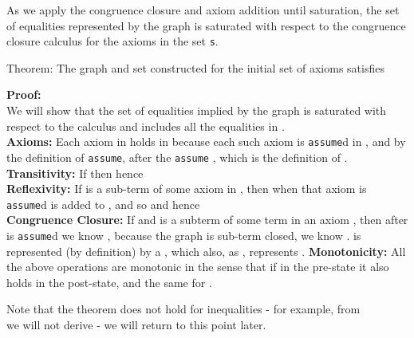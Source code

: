 As we apply the congruence closure and axiom addition until saturation, the set of equalities represented by the graph is saturated with respect to the congruence closure calculus for the axioms in the set \lstinline{s}.
\begin{theorem}
Theorem: The graph  and set  constructed for the initial set of axioms  satisfies 

\noindent
\textbf{Proof:} \\
We will show that the set of equalities implied by the graph is saturated with respect to the calculus and includes all the equalities in .\\
\textbf{Axioms:} Each axiom  in  holds in  because each such axiom is \lstinline{assume}d in , and by the definition of \lstinline{assume}, after the \lstinline{assume} , which is the definition of .\\
\textbf{Transitivity:} If  then  hence \\
\textbf{Reflexivity:} If  is a sub-term of some axiom in , then when that axiom is \lstinline{assume}d  is added to , and so  and  hence \\
\textbf{Congruence Closure:} If  and  is a subterm of some term  in an axiom , then after  is \lstinline{assume}d we know , because the graph is sub-term closed, we know .
 is represented (by definition) by a \GFAEC {}, which also, as , represents .
\textbf{Monotonicity:} All the above operations are monotonic in the sense that if  in the pre-state it also holds in the post-state, and the same for .
\end{theorem}
Note that the theorem does not hold for inequalities - for example, from \\
 we will not derive  - we will return to this point later.

